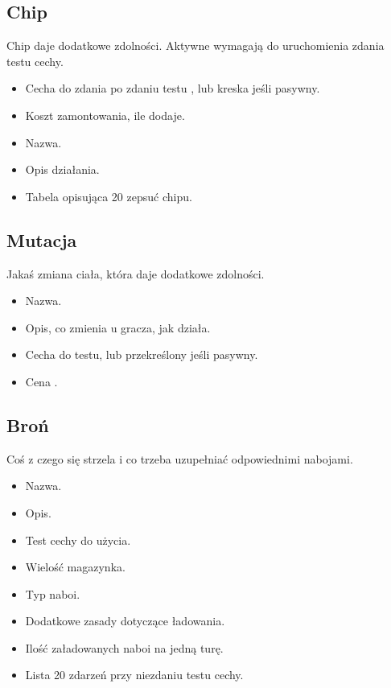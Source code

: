 \subsection{Chip}
Chip daje dodatkowe zdolności.
Aktywne wymagają do uruchomienia zdania testu cechy.
\begin{itemize}
 \item Cecha do zdania po zdaniu testu \abnkp{}, lub kreska jeśli pasywny.
 \item Koszt zamontowania, ile \abnkp{} dodaje.
 \item Nazwa.
 \item Opis działania.
 \item Tabela opisująca 20 zepsuć chipu.
\end{itemize}

\subsection{Mutacja}
Jakaś zmiana ciała, która daje dodatkowe zdolności.
\begin{itemize}
 \item Nazwa.
 \item Opis, co zmienia u gracza, jak działa.
 \item Cecha do testu, lub przekreślony jeśli pasywny.
 \item Cena \abnkp{}. 
\end{itemize}

\subsection{Broń}
Coś z czego się strzela i co trzeba uzupełniać odpowiednimi nabojami.
\begin{itemize}
 \item Nazwa.
 \item Opis.
 \item Test cechy do użycia.
 \item Wielość magazynka.
 \item Typ naboi.
 \item Dodatkowe zasady dotyczące ładowania.
 \item Ilość załadowanych naboi na jedną turę.
 \item Lista 20 zdarzeń przy niezdaniu testu cechy.
\end{itemize}











